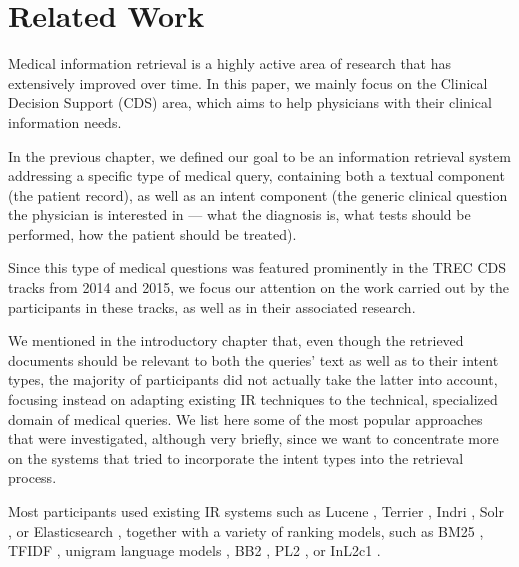 \chapter{Related Work} \label{related}

Medical information retrieval is a highly active area of research that has extensively improved over time. 
In this paper, we mainly focus on the Clinical Decision Support (CDS) area, which aims to help
physicians with their clinical information needs.

In the previous chapter, we defined our goal to be
an information retrieval system addressing a specific type of medical query,
containing both a textual component (the patient record), as well as an intent component
(the generic clinical question the physician is interested in 
--- what the diagnosis is, what tests should be performed, how the patient should be treated).

Since this type of medical questions was featured prominently in the TREC CDS tracks from 2014 and 2015,
we focus our attention on the work carried out by the participants in these tracks, as well as in
 their associated research.
 
We mentioned in the introductory chapter that, even though the retrieved documents should be
relevant to both the queries' text as well as to their intent types, the majority of participants
did not actually take the latter into account, focusing instead on adapting existing
IR techniques to the technical, specialized domain of medical queries. We list here some of the most
popular approaches that were investigated, although very briefly, since we want to concentrate more on the systems that
tried to incorporate the intent types into the retrieval process.

Most participants used existing IR systems such as
Lucene \cite{ucla, goodwin2014utd, jiang2016clinical, oh2014kisti, novasearch, CSEIITV, wei2014atigeo}, 
Terrier \cite{dinh2014crp, snomeddawit, bitem, waterloo, song2015ecnu, mutrec, sankhavara2014fusing, cuhk},
Indri \cite{ir.cs.sfsu, choi, duth, wei2014atigeo, wsuir},
Solr \cite{waterloo},
or Elasticsearch \cite{lamda2015},
together with a variety of ranking models, such as 
BM25 \cite{dinh2014crp, snomeddawit, bitem, goodwin2014utd, novasearch, song2015ecnu},
TFIDF \cite{dinh2014crp, ucla, novasearch},
unigram language models \cite{ir.cs.sfsu, choi, ucla, oh2014kisti, novasearch},
BB2 \cite{song2015ecnu},
PL2 \cite{waterloo, song2015ecnu},
or InL2c1 \cite{snomeddawit}.


